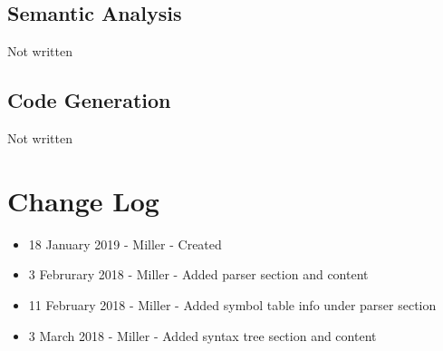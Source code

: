 \documentclass[english]{article}
\begin{document}
\subsection{Semantic Analysis}

Not written

\subsection{Code Generation}

Not written



\par\addvspace{1cm}%
\section{Change Log}

\begin{itemize}
\item
18 January 2019 - Miller - Created
\item
3 Februrary 2018 - Miller - Added parser section and content
\item
11 February 2018 - Miller - Added symbol table info under parser section
\item
3 March 2018 - Miller - Added syntax tree section and content

\end{itemize}
\end{document}
